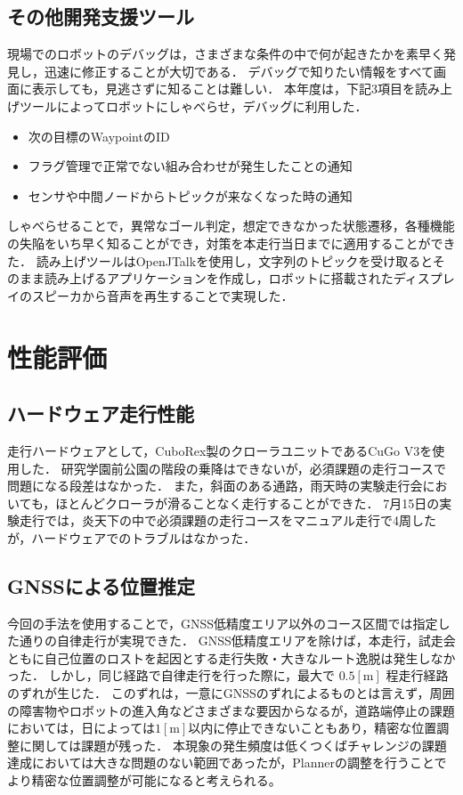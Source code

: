 \documentclass[platex,dvipdfmx]{rbproceedings}
\begin{document}
\subsection{その他開発支援ツール}
現場でのロボットのデバッグは，さまざまな条件の中で何が起きたかを素早く発見し，迅速に修正することが大切である．
デバッグで知りたい情報をすべて画面に表示しても，見逃さずに知ることは難しい．
本年度は，下記3項目を読み上げツールによってロボットにしゃべらせ，デバッグに利用した．
\begin{itemize}
    \item 次の目標のWaypointのID
    \item フラグ管理で正常でない組み合わせが発生したことの通知
    \item センサや中間ノードからトピックが来なくなった時の通知
\end{itemize}
しゃべらせることで，異常なゴール判定，想定できなかった状態遷移，各種機能の失陥をいち早く知ることができ，対策を本走行当日までに適用することができた．
読み上げツールはOpenJTalk\cite{openjtalk}を使用し，文字列のトピックを受け取るとそのまま読み上げるアプリケーションを作成し，ロボットに搭載されたディスプレイのスピーカから音声を再生することで実現した．

\section{性能評価}
\subsection{ハードウェア走行性能}
走行ハードウェアとして，CuboRex製のクローラユニットであるCuGo V3を使用した．
研究学園前公園の階段の乗降はできないが，必須課題の走行コースで問題になる段差はなかった．
また，斜面のある通路，雨天時の実験走行会においても，ほとんどクローラが滑ることなく走行することができた．
7月15日の実験走行では，炎天下の中で必須課題の走行コースをマニュアル走行で4周したが，ハードウェアでのトラブルはなかった．

\subsection{GNSSによる位置推定} \label{ss:gnss_eval}
今回の手法を使用することで，GNSS低精度エリア以外のコース区間では指定した通りの自律走行が実現できた．
GNSS低精度エリアを除けば，本走行，試走会ともに自己位置のロストを起因とする走行失敗・大きなルート逸脱は発生しなかった．
しかし，同じ経路で自律走行を行った際に，最大で $0.5[\mathrm{m}]$ 程走行経路のずれが生じた．
このずれは，一意にGNSSのずれによるものとは言えず，周囲の障害物やロボットの進入角などさまざまな要因からなるが，道路端停止の課題においては，日によっては$1[ \mathrm{m}]$以内に停止できないこともあり，精密な位置調整に関しては課題が残った．
本現象の発生頻度は低くつくばチャレンジの課題達成においては大きな問題のない範囲であったが，Plannerの調整を行うことでより精密な位置調整が可能になると考えられる。
\end{document}

